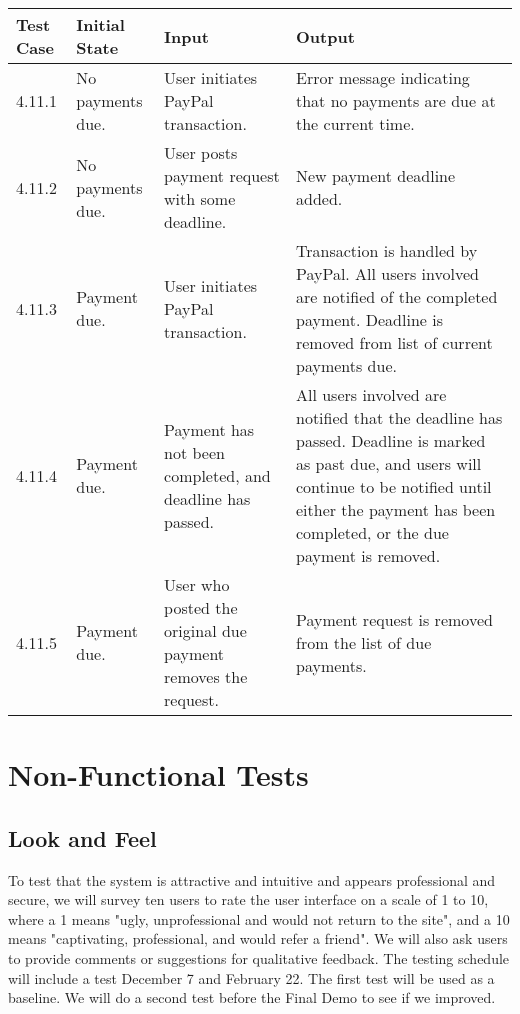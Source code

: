 \documentclass[12pt]{article}
\begin{document}
\begin{longtable}{|p{2cm}|p{3cm}|p{5cm}|p{5cm}|}
\hline
\textbf{Test Case} & \textbf{Initial State} & \textbf{Input} & \textbf{Output} \\ \hline
4.11.1 & No payments due. & User initiates PayPal transaction. & Error message indicating that no payments are due at the current time.\\
\hline
4.11.2 & No payments due. & User posts payment request with some deadline. & New payment deadline added.\\
\hline
4.11.3 & Payment due. & User initiates PayPal transaction. & Transaction is handled by PayPal. All users involved are notified of the completed payment. Deadline is removed from list of current payments due.\\
\hline
4.11.4 & Payment due. & Payment has not been completed, and deadline has passed. & All users involved are notified that the deadline has passed. Deadline is marked as past due, and users will continue to be notified until either the payment has been completed, or the due payment is removed.\\
\hline
4.11.5 & Payment due. & User who posted the original due payment removes the request. & Payment request is removed from the list of due payments.\\
\hline
\end{longtable}


\section{Non-Functional Tests}

\subsection{Look and Feel}
To test that the system is attractive and intuitive and appears professional and secure, we will survey ten users to rate the user interface on a scale of 1 to 10, where a 1 means "ugly, unprofessional and would not return to the site", and a 10 means "captivating, professional, and would refer a friend". We will also ask users to provide comments or suggestions for qualitative feedback. The testing schedule will include a test December 7 and February 22. The first test will be used as a baseline. We will do a second test before the Final Demo to see if we improved.
\end{document}
